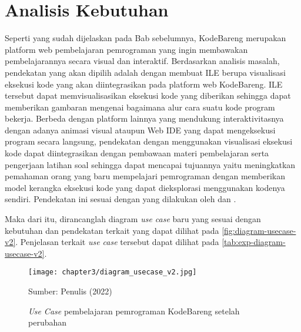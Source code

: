 
\section{Analisis Kebutuhan} \label{sec:analisis-kebutuhan}
Seperti yang sudah dijelaskan pada Bab sebelumnya, KodeBareng merupakan platform web pembelajaran pemrograman yang ingin membawakan pembelajarannya secara visual dan interaktif. Berdasarkan analisis masalah, pendekatan yang akan dipilih adalah dengan membuat ILE berupa visualisasi eksekusi kode yang akan diintegrasikan pada platform web KodeBareng. ILE tersebut dapat memvisualisasikan eksekusi kode yang diberikan sehingga dapat memberikan gambaran mengenai bagaimana alur cara suatu kode program bekerja. Berbeda dengan platform lainnya yang mendukung interaktivitasnya dengan adanya animasi visual ataupun Web IDE yang dapat mengeksekusi program secara langsung, pendekatan dengan menggunakan visualisasi eksekusi kode dapat diintegrasikan dengan pembawaan materi pembelajaran serta pengerjaan latihan soal sehingga dapat mencapai tujuannya yaitu meningkatkan pemahaman orang yang baru mempelajari pemrograman dengan memberikan model kerangka eksekusi kode yang dapat dieksplorasi menggunakan kodenya sendiri. Pendekatan ini sesuai dengan yang dilakukan oleh \textcite{moons2013pilot} dan \textcite{mayer1981psychology}.

Maka dari itu, dirancanglah diagram \textit{use case} baru yang sesuai dengan kebutuhan dan pendekatan terkait yang dapat dilihat pada \autoref{fig:diagram-usecase-v2}. Penjelasan terkait \textit{use case} tersebut dapat dilihat pada \autoref{tab:exp-diagram-usecase-v2}.

\begin{figure}[H]
  \centering
  \texttt{[image: chapter3/diagram\_usecase\_v2.jpg]}
  \caption{\textit{Use Case} pembelajaran pemrograman KodeBareng setelah perubahan} \label{fig:diagram-usecase-v2}
  Sumber: Penulis (2022)
\end{figure}

